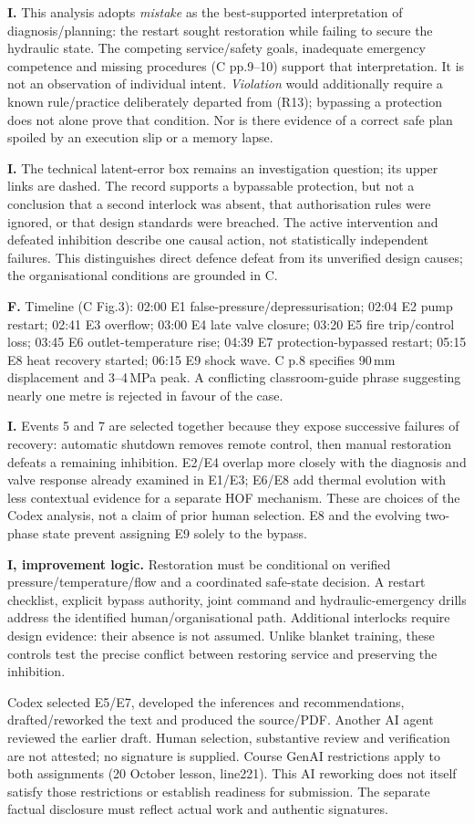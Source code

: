 \documentclass[10pt,a4paper]{article}
\newcommand{\sect}[1]{\par\vspace{2mm}{\bfseries\color{ink}#1}\par}
\begin{document}
\textbf{I.} This analysis adopts \emph{mistake} as the best-supported interpretation of diagnosis/planning: the restart sought restoration while failing to secure the hydraulic state. The competing service/safety goals, inadequate emergency competence and missing procedures (C pp.9--10) support that interpretation. It is not an observation of individual intent. \emph{Violation} would additionally require a known rule/practice deliberately departed from (R13); bypassing a protection does not alone prove that condition. Nor is there evidence of a correct safe plan spoiled by an execution slip or a memory lapse.

\textbf{I.} The technical latent-error box remains an investigation question; its upper links are dashed. The record supports a bypassable protection, but not a conclusion that a second interlock was absent, that authorisation rules were ignored, or that design standards were breached. The active intervention and defeated inhibition describe one causal action, not statistically independent failures. This distinguishes direct defence defeat from its unverified design causes; the organisational conditions are grounded in C.
\sect{Chronology and selection}
\textbf{F.} Timeline (C Fig.3): 02:00 E1 false-pressure/depressurisation; 02:04 E2 pump restart; 02:41 E3 overflow; 03:00 E4 late valve closure; 03:20 E5 fire trip/control loss; 03:45 E6 outlet-temperature rise; 04:39 E7 protection-bypassed restart; 05:15 E8 heat recovery started; 06:15 E9 shock wave. C p.8 specifies 90\,mm displacement and 3--4\,MPa peak. A conflicting classroom-guide phrase suggesting nearly one metre is rejected in favour of the case.

\textbf{I.} Events 5 and 7 are selected together because they expose successive failures of recovery: automatic shutdown removes remote control, then manual restoration defeats a remaining inhibition. E2/E4 overlap more closely with the diagnosis and valve response already examined in E1/E3; E6/E8 add thermal evolution with less contextual evidence for a separate HOF mechanism. These are choices of the Codex analysis, not a claim of prior human selection. E8 and the evolving two-phase state prevent assigning E9 solely to the bypass.

\textbf{I, improvement logic.} Restoration must be conditional on verified pressure/temperature/flow and a coordinated safe-state decision. A restart checklist, explicit bypass authority, joint command and hydraulic-emergency drills address the identified human/organisational path. Additional interlocks require design evidence: their absence is not assumed. Unlike blanket training, these controls test the precise conflict between restoring service and preserving the inhibition.
\sect{GenAI disclosure and references}
Codex selected E5/E7, developed the inferences and recommendations, drafted/reworked the text and produced the source/PDF. Another AI agent reviewed the earlier draft. Human selection, substantive review and verification are not attested; no signature is supplied. Course GenAI restrictions apply to both assignments (20 October lesson, line221). This AI reworking does not itself satisfy those restrictions or establish readiness for submission. The separate factual disclosure must reflect actual work and authentic signatures.
\end{document}
